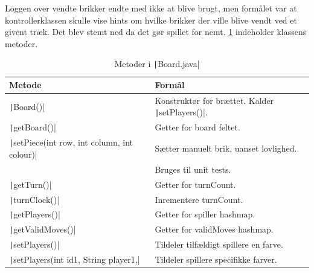 Loggen over vendte brikker endte med ikke at blive brugt, men formålet var at kontrollerklassen skulle vise hints om hvilke brikker der ville blive vendt ved et givent træk. Det blev stemt ned da det gør spillet for nemt.\newline
\cref{tbl:boardmethods} indeholder klassens metoder.
\begin{table}[H]
    \centering
    \caption{Metoder i \texttt|Board.java|}\label{tbl:boardmethods}
    \begin{tabular}{ll}
        \toprule
        Metode                                                        & Formål                                                                \\
        \midrule
        \texttt|Board()|                                    & Konstruktør for brættet. Kalder \texttt|setPlayers()|.      \\
        \texttt|getBoard()|                                 & Getter for board feltet.                                              \\
        \texttt|setPiece(int row, int column, int colour)|  & Sætter manuelt brik, uanset lovlighed.                                \\
                                                                      & Bruges til unit tests.                                                \\
        \texttt|getTurn()|                                  & Getter for turnCount.                                                 \\
        \texttt|turnClock()|                                & Inrementere turnCount.                                                \\
        \texttt|getPlayers()|                               & Getter for spiller hashmap.                                           \\
        \texttt|getValidMoves()|                            & Getter for validMoves hashmap.                                        \\
        \texttt|setPlayers()|                               & Tildeler tilfældigt spillere en farve.                                \\
        \texttt|setPlayers(int id1, String player1,|        & Tildeler spillere specifikke farver.                                  \\

\end{tabular}
\end{table}
